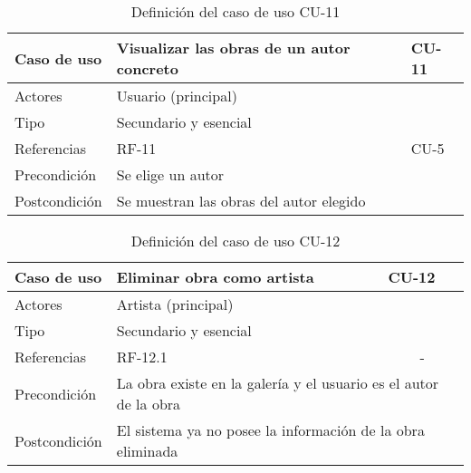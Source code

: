 \begin{table}[H]
    \begin{tabular}{|p{3cm}|p{5cm}|p{2cm}|}
        \hline
        Caso de uso & Visualizar las obras de un autor concreto & CU-11 \\
        \hline
        Actores & \multicolumn{2}{|p{7cm}|}{Usuario (principal)} \\
        \hline
        Tipo & \multicolumn{2}{|p{7cm}|}{Secundario y esencial} \\
        \hline
        Referencias & RF-11 & CU-5 \\
        \hline
        Precondición & \multicolumn{2}{|p{7cm}|}{Se elige un autor} \\
        \hline
        Postcondición & \multicolumn{2}{|p{7cm}|}{Se muestran las obras
        del autor elegido} \\
        \hline
    \end{tabular}
    \caption{Definición del caso de uso CU-11}
    \label{tab:cu_11}
\end{table}

\begin{table}[H]
    \begin{tabular}{|p{3cm}|p{5cm}|p{2cm}|}
        \hline
        Caso de uso & Eliminar obra como artista & CU-12 \\
        \hline
        Actores & \multicolumn{2}{|p{7cm}|}{Artista (principal)} \\
        \hline
        Tipo & \multicolumn{2}{|p{7cm}|}{Secundario y esencial} \\
        \hline
        Referencias & RF-12.1 & \multicolumn{1}{|c|}{-} \\
        \hline
        Precondición & \multicolumn{2}{|p{7cm}|}{La obra existe en la galería
        y el usuario es el autor de la obra} \\
        \hline
        Postcondición & \multicolumn{2}{|p{7cm}|}{El sistema ya no posee
        la información de la obra eliminada} \\
        \hline
    \end{tabular}
    \caption{Definición del caso de uso CU-12}
    \label{tab:cu_12}
\end{table}

